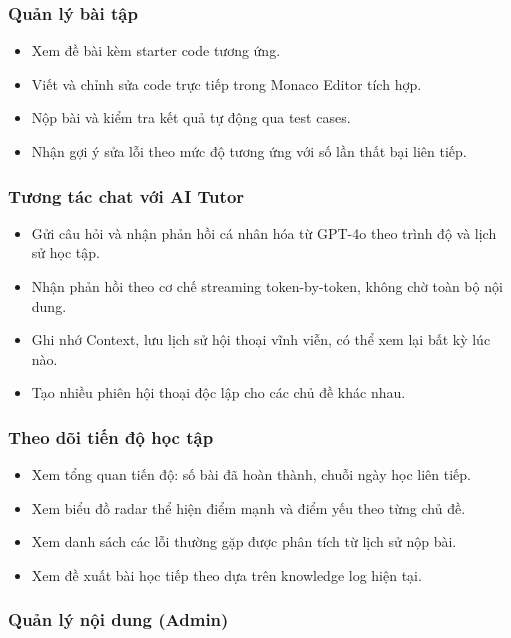 \documentclass[../main.tex]{subfiles}
\begin{document}
\subsubsection{Quản lý bài tập}

\begin{itemize}
    \item Xem đề bài kèm starter code tương ứng.
    \item Viết và chỉnh sửa code trực tiếp trong Monaco Editor tích hợp.
    \item Nộp bài và kiểm tra kết quả tự động qua test cases.
    \item Nhận gợi ý sửa lỗi theo mức độ tương ứng với số lần thất bại liên tiếp.
\end{itemize}

\subsubsection{Tương tác chat với AI Tutor}

\begin{itemize}
    \item Gửi câu hỏi và nhận phản hồi cá nhân hóa từ GPT-4o theo trình độ và lịch sử học tập.
    \item Nhận phản hồi theo cơ chế streaming token-by-token, không chờ toàn bộ nội dung.
    \item Ghi nhớ Context, lưu lịch sử hội thoại vĩnh viễn, có thể xem lại bất kỳ lúc nào.
    \item Tạo nhiều phiên hội thoại độc lập cho các chủ đề khác nhau.
\end{itemize}

\subsubsection{Theo dõi tiến độ học tập}

\begin{itemize}
    \item Xem tổng quan tiến độ: số bài đã hoàn thành, chuỗi ngày học liên tiếp.
    \item Xem biểu đồ radar thể hiện điểm mạnh và điểm yếu theo từng chủ đề.
    \item Xem danh sách các lỗi thường gặp được phân tích từ lịch sử nộp bài.
    \item Xem đề xuất bài học tiếp theo dựa trên knowledge log hiện tại.
\end{itemize}

\subsubsection{Quản lý nội dung (Admin)}
\end{document}

